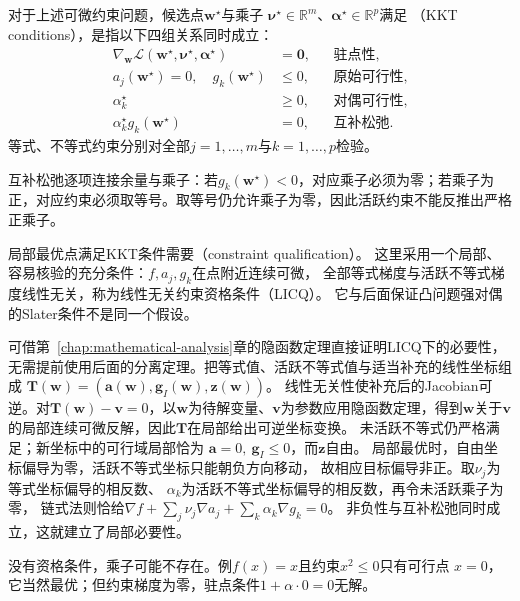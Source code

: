 \begin{definition}[KKT条件]
\label{def:opt-kkt-conditions}
对于上述可微约束问题，候选点$\bm w^\star$与乘子
$\bm\nu^\star\in\mathbb R^m$、$\bm\alpha^\star\in\mathbb R^p$满足
（KKT conditions），是指以下四组关系同时成立：
\begin{align}
  \nabla_{\bm{w}}\mathcal{L}(\bm{w}^{\star},\bm{\nu}^{\star},
  \bm{\alpha}^{\star})&=\bm{0},
  &&\text{驻点性},\label{eq:opt-kkt-stationarity}\\
  a_j(\bm{w}^{\star})=0,\quad g_k(\bm{w}^{\star})&\leq0,
  &&\text{原始可行性},\\
  \alpha_k^{\star}&\geq0,
  &&\text{对偶可行性},\\
  \alpha_k^{\star}g_k(\bm{w}^{\star})&=0,
  &&\text{互补松弛}.\label{eq:opt-kkt-complementarity}
\end{align}
等式、不等式约束分别对全部$j=1,\ldots,m$与$k=1,\ldots,p$检验。
\end{definition}
互补松弛逐项连接余量与乘子：若$g_k(\bm w^\star)<0$，对应乘子必须为零；若乘子为正，对应约束必须取等号。取等号仍允许乘子为零，因此活跃约束不能反推出严格正乘子。

局部最优点满足KKT条件需要（constraint qualification）。
这里采用一个局部、容易核验的充分条件：$f,a_j,g_k$在点附近连续可微，
全部等式梯度与活跃不等式梯度线性无关，称为线性无关约束资格条件（LICQ）。
它与后面保证凸问题强对偶的Slater条件不是同一个假设。

可借第~\ref{chap:mathematical-analysis}章的隐函数定理直接证明LICQ下的必要性，
无需提前使用后面的分离定理。把等式值、活跃不等式值与适当补充的线性坐标组成
$\bm T(\bm w)=(\bm a(\bm w),\bm g_I(\bm w),\bm z(\bm w))$。
线性无关性使补充后的Jacobian可逆。对$\bm T(\bm w)-\bm v=0$，以$\bm w$为待解变量、$\bm v$为参数应用隐函数定理，得到$\bm w$关于$\bm v$的局部连续可微反解，因此$\bm T$在局部给出可逆坐标变换。
未活跃不等式仍严格满足；新坐标中的可行域局部恰为
$\bm a=0,\ \bm g_I\leq0$，而$\bm z$自由。
局部最优时，自由坐标偏导为零，活跃不等式坐标只能朝负方向移动，
故相应目标偏导非正。取$\nu_j$为等式坐标偏导的相反数、
$\alpha_k$为活跃不等式坐标偏导的相反数，再令未活跃乘子为零，
链式法则恰给$\nabla f+\sum_j\nu_j\nabla a_j+\sum_k\alpha_k\nabla g_k=0$。
非负性与互补松弛同时成立，这就建立了局部必要性。

没有资格条件，乘子可能不存在。例$f(x)=x$且约束$x^2\leq0$只有可行点
$x=0$，它当然最优；但约束梯度为零，驻点条件$1+\alpha\cdot0=0$无解。

